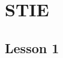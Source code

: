 \documentclass[oneside, 10pt]{memoir}
\begin{document}
\chapter{STIE}

\section{Lesson 1}
\end{document}
